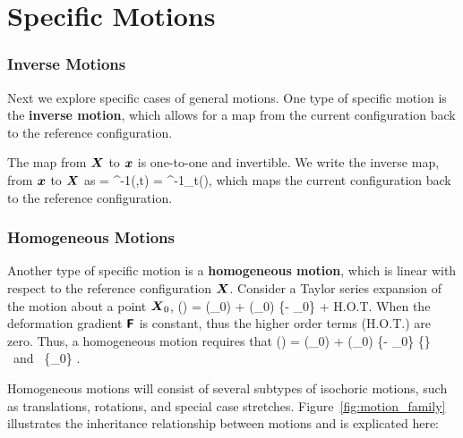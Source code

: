 \chapter{Specific Motions}
\label{sec:specific_motions}


\subsection{Inverse Motions}
Next we explore specific cases of general motions.  
One type of specific motion is the {\bf inverse motion}, which allows
for a map from the current configuration back to the reference
configuration.

The map from $\mbox{\boldmath $X$}$ to $\mbox{\boldmath $x$}$ is one-to-one and invertible.  
We write the inverse map, from $\mbox{\boldmath $x$}$ to $\mbox{\boldmath $X$}$ as
\be
\vX = \vvarphi^{-1}(\vx,t) = \vvarphi^{-1}_t(\vx),
\label{eq:motion_inverse}
\ee
which maps the current configuration back to the reference 
configuration.


\subsection{Homogeneous Motions}
Another type of specific motion is a {\bf homogeneous motion}, which 
is linear with respect to the reference configuration $\mbox{\boldmath $X$}$.  
Consider a Taylor series expansion of the motion about a point 
$\mbox{\boldmath $X$}_0$,
\be
 \vvarphi(\vX) = \vvarphi(\vX_0) + \tFbold(\vX_0) \cdot 
 \{\vX - \vX_0\} + 
 \mbox{\small H.O.T.}
 \label{eq:Taylor_F}
\ee
When the deformation gradient $\mbox{\sffamily\bfseries F}$ is constant, thus the 
higher order terms ({\small H.O.T.}) are zero.  Thus, a homogeneous
motion requires that
\be
 \vvarphi(\vX) = \vvarphi(\vX_0) + \tFbold(\vX_0)
 \cdot \{\vX - \vX_0\} 
 \;\; \forall \;\; \{\vX\} \mbox{ and } \{\vX_0\} \in \cB.
 \label{eq:homogeneous_motion}
\ee

Homogeneous motions will consist of several subtypes of isochoric 
motions, such as translations, rotations, and special case stretches.  
Figure~\ref{fig:motion_family} illustrates the inheritance relationship
between motions and is explicated here:

